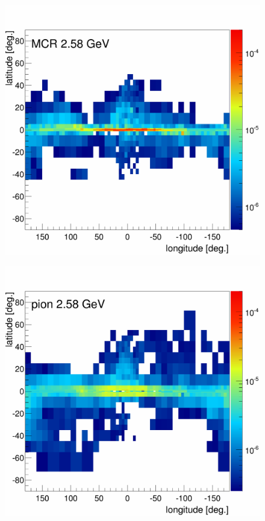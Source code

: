 \begin{figure}[h]
\begin{minipage}[h]{0.45\textwidth}
  	\label{fig:MCRonly_skymap_IC}
  \end{minipage}
  \hfill
  \begin{minipage}[h]{0.45\textwidth}
  	\centering
	\includegraphics[width=1.\linewidth]{pic/results/MCRonly_MCR_fluxE12_skymap.png}
  	\label{fig:MCRonly_skymap_MCR}
  \end{minipage}
  \hfill
  \begin{minipage}[h]{0.45\textwidth}
  	\centering
	\includegraphics[width=1.\linewidth]{pic/results/MCRonly_PCR_fluxE12_skymap.png}

\end{minipage}
\end{figure}
